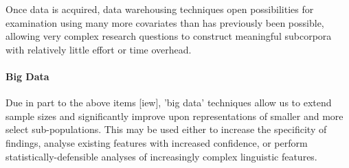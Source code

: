 Once data is acquired, data warehousing techniques open possibilities for examination using many more covariates than has previously been possible, allowing very complex research questions to construct meaningful subcorpora with relatively little effort or time overhead.


\paragraph{Big Data}
Due in part to the above items [iew], 'big data' techniques allow us to extend sample sizes and significantly improve upon representations of smaller and more select sub-populations.  This may be used either to increase the specificity of findings, analyse existing features with increased confidence, or perform statistically-defensible analyses of increasingly complex linguistic features.







